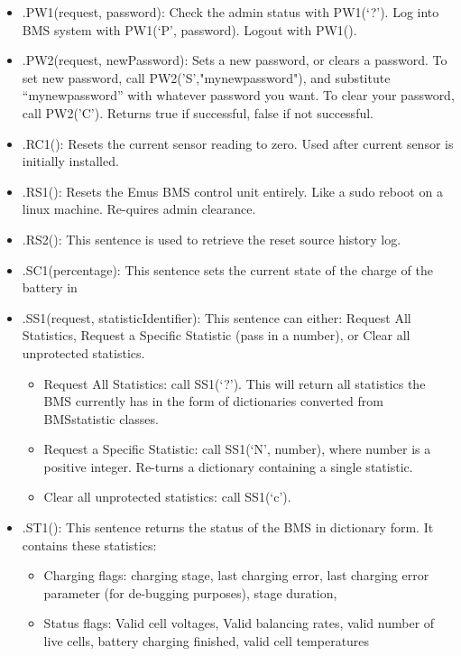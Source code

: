 \begin{itemize}
	\item .PW1(request, password): Check the admin status with PW1(‘?’). Log into BMS system with PW1(‘P’, password). Logout with PW1().
	\item .PW2(request, newPassword): Sets a new password, or clears a password. To set new password, call PW2('S',"mynewpassword"), and substitute “mynewpassword” with whatever password you want. To clear your password, call PW2('C'). Returns true if successful, false if not successful.
	\item .RC1(): Resets the current sensor reading to zero. Used after current sensor is initially installed.
	\item .RS1(): Resets the Emus BMS control unit entirely. Like a sudo reboot on a linux machine. Re-quires admin clearance.
	\item .RS2(): This sentence is used to retrieve the reset source history log.
	\item .SC1(percentage): This sentence sets the current state of the charge of the battery in %
	\item .SS1(request, statisticIdentifier): This sentence can either: Request All Statistics, Request a Specific Statistic (pass in a number), or Clear all unprotected statistics.
	\begin{itemize}
		\item Request All Statistics: call SS1(‘?’). This will return all statistics the BMS currently has in the form of dictionaries converted from BMSstatistic classes.
		\item Request a Specific Statistic: call SS1(‘N’, number), where number is a positive integer. Re-turns a dictionary containing a single statistic.
		\item Clear all unprotected statistics: call SS1(‘c’). 
	\end{itemize}
	\item .ST1(): This sentence returns the status of the BMS in dictionary form. It contains these statistics:
	\begin{itemize}
		\item Charging flags: charging stage, last charging error, last charging error parameter (for de-bugging purposes), stage duration, 
		\item Status flags: Valid cell voltages, Valid balancing rates, valid number of live cells, battery charging finished, valid cell temperatures

\end{itemize}
\end{itemize}

